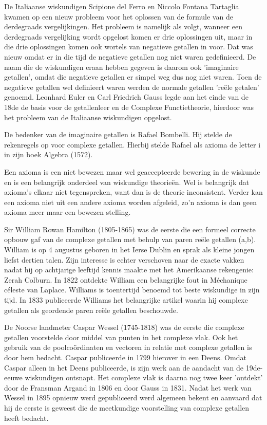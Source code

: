 \documentclass[11pt,fleqn]{book} %
\begin{document}
De Italiaanse wiskundigen Scipione del Ferro en Niccolo Fontana Tartaglia kwamen op een nieuw probleem voor het oplossen van de formule van de derdegraads vergelijkingen. Het probleem is namelijk als volgt, wanneer een derdegraads vergelijking wordt opgelost komen er drie oplossingen uit, maar in die drie oplossingen komen ook wortels van negatieve getallen in voor. Dat was nieuw omdat er in die tijd de negatieve getallen nog niet waren gedefinieerd. De naam die de wiskundigen eraan hebben gegeven is daarom ook 'imaginaire getallen', omdat die negatieve getallen er simpel weg dus nog niet waren. Toen de negatieve getallen wel definieert waren werden de normale getallen 'reële getalen' genoemd. Leonhard Euler en Carl Friedrich Gauss legde aan het einde van de 18de de basis voor de getallenleer en de Complexe Functietheorie, hierdoor was het probleem van de Italiaanse wiskundigen opgelost.

De bedenker van de imaginaire getallen is Rafael Bombelli. Hij stelde de rekenregels op voor complexe getallen. Hierbij stelde Rafael als axioma de letter i in zijn boek Algebra (1572).

Een axioma is een niet bewezen maar wel geaccepteerde bewering in de wiskunde en is een belangrijk onderdeel van wiskundige theorieën. Wel is belangrijk dat axioma’s elkaar niet tegenspreken, want dan is de theorie inconsistent. Verder kan een axioma niet uit een andere axioma worden afgeleid, zo’n axioma is dan geen axioma meer maar een bewezen stelling.

Sir William Rowan Hamilton (1805-1865) was de eerste die een formeel correcte opbouw gaf van de complexe getallen met behulp van paren reële getallen (a,b). William is op 4 augustus geboren in het Ierse Dublin en sprak als kleine jongen liefst dertien talen. Zijn interesse is echter verschoven naar de exacte vakken nadat hij op achtjarige leeftijd kennis maakte met het Amerikaanse rekengenie: Zerah Colburn. In 1822 ontdekte William een belangrijke fout in Méchanique céleste van Laplace. Williams is toentertijd benoemd tot beste wiskundige in zijn tijd. In 1833 publiceerde Williams het belangrijke artikel waarin hij complexe getallen als geordende paren reële getallen beschouwde.

De Noorse landmeter Caspar Wessel (1745-1818) was de eerste die complexe getallen voorstelde door middel van punten in het complexe vlak. Ook het gebruik van de poolcoördinaten en vectoren in relatie met complexe getallen is door hem bedacht. Caspar publiceerde in 1799 hierover in een Deens. Omdat Caspar alleen in het Deens publiceerde, is zijn werk aan de aandacht van de 19de-eeuwe wiskundigen ontsnapt. Het complexe vlak is daarna nog twee keer 'ontdekt' door de Fransman Argand in 1806 en door Gauss in 1831. Nadat het werk van Wessel in 1895 opnieuw werd gepubliceerd werd algemeen bekent en aanvaard dat hij de eerste is geweest die de meetkundige voorstelling van complexe getallen heeft bedacht.
\end{document}
